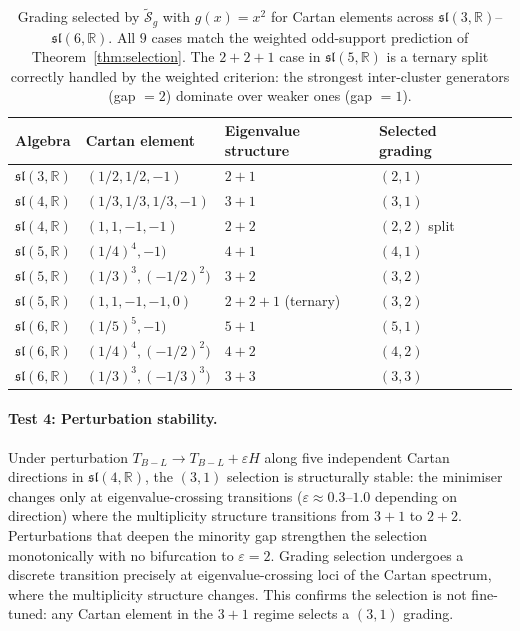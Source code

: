 \documentclass[11pt]{article}
\theoremstyle{plain}
\theoremstyle{definition}
\theoremstyle{remark}
\newcommand{\sln}[1]{\mathfrak{sl}(#1,\mathbb{R})}
\newcommand{\TBL}{T_{B\!-\!L}}
\begin{document}
\begin{table}[h]
\centering\small
\begin{tabular}{@{}lllll@{}}
\toprule
Algebra & Cartan element & Eigenvalue structure & Selected grading \\
\midrule
$\sln{3}$ & $(1/2, 1/2, -1)$ & $2+1$ & $(2,1)$ \\
$\sln{4}$ & $(1/3, 1/3, 1/3, -1)$ & $3+1$ & $(3,1)$ \\
$\sln{4}$ & $(1, 1, -1, -1)$ & $2+2$ & $(2,2)$ split \\
$\sln{5}$ & $(1/4)^4, -1)$ & $4+1$ & $(4,1)$ \\
$\sln{5}$ & $(1/3)^3, (-1/2)^2)$ & $3+2$ & $(3,2)$ \\
$\sln{5}$ & $(1, 1, -1, -1, 0)$ & $2+2+1$ (ternary) & $(3,2)$ \\
$\sln{6}$ & $(1/5)^5, -1)$ & $5+1$ & $(5,1)$ \\
$\sln{6}$ & $(1/4)^4, (-1/2)^2)$ & $4+2$ & $(4,2)$ \\
$\sln{6}$ & $(1/3)^3, (-1/3)^3)$ & $3+3$ & $(3,3)$ \\
\bottomrule
\end{tabular}
\caption{Grading selected by $\widetilde{\mathcal{S}}_g$ with $g(x) = x^2$
for Cartan elements
across $\sln{3}$--$\sln{6}$.  All $9$ cases match the
weighted odd-support prediction of Theorem~\ref{thm:selection}.
The $2{+}2{+}1$ case in $\sln{5}$ is a ternary split correctly
handled by the weighted criterion: the strongest inter-cluster
generators (gap $= 2$) dominate over weaker ones (gap $= 1$).}
\label{tab:generators}
\end{table}

\paragraph{Test 4: Perturbation stability.}
Under perturbation $\TBL \to \TBL + \varepsilon H$ along five
independent Cartan directions in $\sln{4}$, the $(3,1)$ selection
is structurally stable: the minimiser changes only at
eigenvalue-crossing transitions
($\varepsilon \approx 0.3$--$1.0$ depending on direction) where the
multiplicity structure transitions from $3{+}1$ to $2{+}2$.
Perturbations that deepen the minority gap strengthen the selection
monotonically with no bifurcation to $\varepsilon = 2$.  Grading
selection undergoes a discrete transition precisely at
eigenvalue-crossing loci of the Cartan spectrum, where the
multiplicity structure changes.  This confirms the selection is not
fine-tuned: any Cartan element in the $3{+}1$ regime selects
a $(3,1)$ grading.
\end{document}
